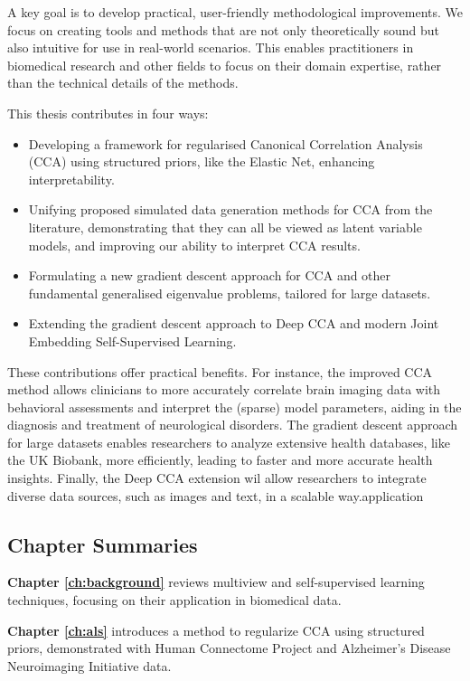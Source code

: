 A key goal is to develop practical, user-friendly methodological improvements.
We focus on creating tools and methods that are not only theoretically sound but also intuitive for use in real-world scenarios.
This enables practitioners in biomedical research and other fields to focus on their domain expertise, rather than the technical details of the methods.

This thesis contributes in four ways:

\begin{itemize}
    \item Developing a framework for regularised Canonical Correlation Analysis (CCA) using structured priors, like the Elastic Net, enhancing interpretability.
    \item Unifying proposed simulated data generation methods for CCA from the literature, demonstrating that they can all be viewed as latent variable models, and improving our ability to interpret CCA results.
    \item Formulating a new gradient descent approach for CCA and other fundamental generalised eigenvalue problems, tailored for large datasets.
    \item Extending the gradient descent approach to Deep CCA and modern Joint Embedding Self-Supervised Learning.
\end{itemize}

These contributions offer practical benefits.
For instance, the improved CCA method allows clinicians to more accurately correlate brain imaging data with behavioral assessments and interpret the (sparse) model parameters, aiding in the diagnosis and treatment of neurological disorders.
The gradient descent approach for large datasets enables researchers to analyze extensive health databases, like the UK Biobank, more efficiently, leading to faster and more accurate health insights.
Finally, the Deep CCA extension wil allow researchers to integrate diverse data sources, such as images and text, in a scalable way.application

\subsection{Chapter Summaries}

\textbf{Chapter \ref{ch:background}} reviews multiview and self-supervised learning techniques, focusing on their application in biomedical data.

\textbf{Chapter \ref{ch:als}} introduces a method to regularize CCA using structured priors, demonstrated with Human Connectome Project and Alzheimer's Disease Neuroimaging Initiative data.

